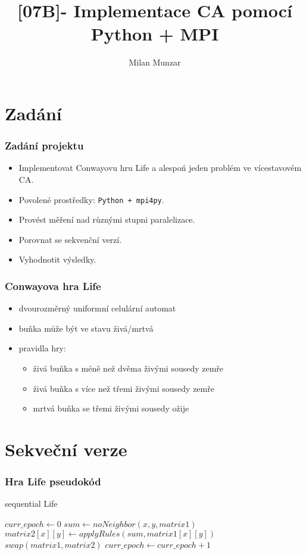 \documentclass{beamer}
\title[Paralelizace CA]{[07B]- Implementace CA pomocí \\ Python + MPI}
\author[M. Munzar]{Milan Munzar}
\institute[FIT VUT]{Fakulta informačních technologií VUT v Brně}
\begin{document}
\frame{\maketitle}

\section{Zadání}
\begin{frame}
\frametitle{Zadání projektu}
    \begin{itemize}
        \item Implementovat Conwayovu hru Life a alespoń jeden problém ve vícestavovém CA.
        \item Povolené prostředky: \texttt{Python + mpi4py}.
        \item Provést měření nad různými stupni paralelizace.
        \item Porovnat se sekvenční verzí.
        \item Vyhodnotit výsledky.
     \end{itemize}
\end{frame}

\begin{frame}
\frametitle{Conwayova hra Life}
    \begin{itemize}
    \item dvourozměrný uniformní celulární automat
    \item buňka může být ve stavu živá/mrtvá
    \item pravidla hry:
      \begin{itemize}
          \item živá buňka s méně než dvěma živými sousedy zemře
          \item živá buňka s více než třemi živými sousedy zemře
          \item mrtvá buňka se třemi živými sousedy ožije
       \end{itemize}
    \end{itemize}
\end{frame}


\section{Sekveční verze}
\begin{frame}
\frametitle{Hra Life pseudokód}
  \begin{algorithm}[H]
  \caption{sequential Life}
  \begin{algorithmic}[1]
    \State $curr\_epoch \leftarrow 0$
            \State $sum \leftarrow noNeighbor(x, y, matrix1)$
            \State $matrix2[x][y] \leftarrow applyRules(sum, matrix1[x][y])$ 
        \EndFor
      \EndFor
      \State $swap(matrix1, matrix2)$
      \State $curr\_epoch \leftarrow curr\_epoch + 1$
    \EndWhile
  \end{algorithmic}
  \end{algorithm}
\end{frame}
\end{document}
